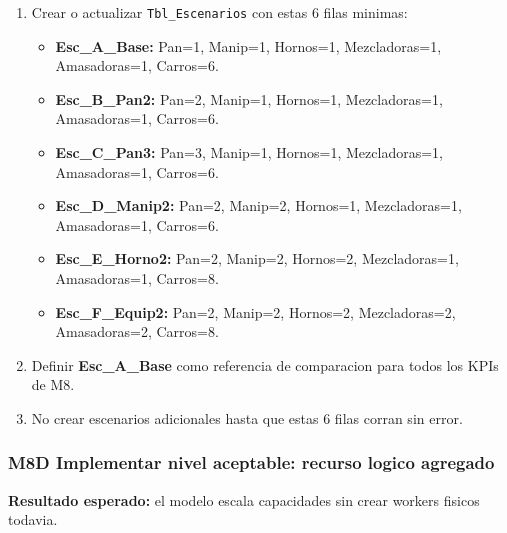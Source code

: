 \documentclass[11pt]{article}
\newcommand{\tabla}[1]{\texttt{#1}}
\begin{document}
\begin{enumerate}
  \item Crear o actualizar \tabla{Tbl\_Escenarios} con estas 6 filas minimas:
  \begin{itemize}
    \item \textbf{Esc\_A\_Base:} Pan=1, Manip=1, Hornos=1, Mezcladoras=1, Amasadoras=1, Carros=6.
    \item \textbf{Esc\_B\_Pan2:} Pan=2, Manip=1, Hornos=1, Mezcladoras=1, Amasadoras=1, Carros=6.
    \item \textbf{Esc\_C\_Pan3:} Pan=3, Manip=1, Hornos=1, Mezcladoras=1, Amasadoras=1, Carros=6.
    \item \textbf{Esc\_D\_Manip2:} Pan=2, Manip=2, Hornos=1, Mezcladoras=1, Amasadoras=1, Carros=6.
    \item \textbf{Esc\_E\_Horno2:} Pan=2, Manip=2, Hornos=2, Mezcladoras=1, Amasadoras=1, Carros=8.
    \item \textbf{Esc\_F\_Equip2:} Pan=2, Manip=2, Hornos=2, Mezcladoras=2, Amasadoras=2, Carros=8.
  \end{itemize}
  \item Definir \textbf{Esc\_A\_Base} como referencia de comparacion para todos los KPIs de M8.
  \item No crear escenarios adicionales hasta que estas 6 filas corran sin error.
\end{enumerate}

\subsubsection{M8D Implementar nivel aceptable: recurso logico agregado}
\textbf{Resultado esperado:} el modelo escala capacidades sin crear workers fisicos todavia.
\end{document}
